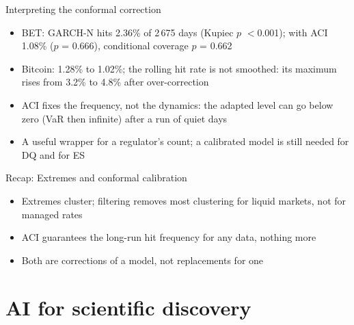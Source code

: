 \begin{frame}{Interpreting the conformal correction}
\itemsize{\small}
\begin{itemize}
    \item BET: GARCH-N hits 2.36\% of 2\,675 days (Kupiec $p$ $<$0.001); with ACI 1.08\% ($p$ = 0.666), conditional coverage $p$ = 0.662
    \item Bitcoin: 1.28\% to 1.02\%; the rolling hit rate is not smoothed: its maximum rises from 3.2\% to 4.8\% after over-correction
    \item ACI fixes the frequency, not the dynamics: the adapted level can go below zero (VaR then infinite) after a run of quiet days
    \item A useful wrapper for a regulator's count; a calibrated model is still needed for DQ and for ES
\end{itemize}
\end{frame}

\begin{frame}{Recap: Extremes and conformal calibration}
\itemsize{\small}
\begin{itemize}
    \item Extremes cluster; filtering removes most clustering for liquid markets, not for managed rates
    \item ACI guarantees the long-run hit frequency for any data, nothing more
    \item Both are corrections of a model, not replacements for one
\end{itemize}
\end{frame}


\section{AI for scientific discovery}

